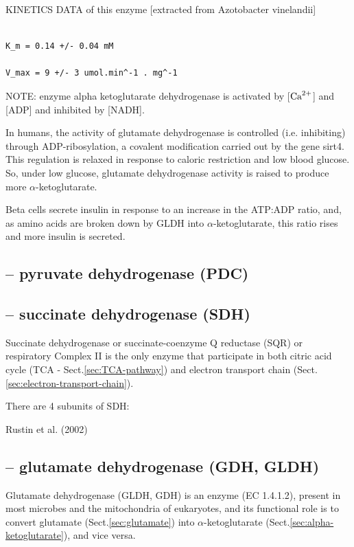 KINETICS DATA of this enzyme [extracted from  Azotobacter vinelandii]
\begin{verbatim}

K_m = 0.14 +/- 0.04 mM 

V_max = 9 +/- 3 umol.min^-1 . mg^-1
\end{verbatim}
NOTE: enzyme alpha ketoglutarate dehydrogenase is activated by [${\text{Ca}^{2+}}$] and
[ADP] and inhibited by [NADH].


In humans, the activity of glutamate dehydrogenase is controlled (i.e.
inhibiting) through ADP-ribosylation, a covalent modification carried out by the
gene sirt4. This regulation is relaxed in response to caloric restriction and
low blood glucose. So, under low glucose, glutamate dehydrogenase activity is
raised to produce more $\alpha$-ketoglutarate.

Beta cells secrete insulin in response to an increase in the ATP:ADP ratio, and,
as amino acids are broken down by GLDH into $\alpha$-ketoglutarate, this ratio rises
and more insulin is secreted.

\subsection{-- pyruvate dehydrogenase (PDC)}
\label{sec:pyruvate-dehydrogenase}
\label{sec:PDC-pyruvate}



\subsection{-- succinate dehydrogenase (SDH)}
\label{sec:succinate-dehydrogenase}

Succinate dehydrogenase or succinate-coenzyme Q reductase (SQR) or respiratory
Complex II is the only enzyme that participate in both citric acid cycle (TCA -
Sect.\ref{sec:TCA-pathway}) and electron transport chain
(Sect.\ref{sec:electron-transport-chain}).

There are 4 subunits of SDH:

Rustin et al. (2002)


\subsection{-- glutamate dehydrogenase (GDH, GLDH)}
\label{sec:glutamate-dehydrogenase}

Glutamate dehydrogenase (GLDH, GDH) is an enzyme (EC 1.4.1.2), present in most microbes and
the mitochondria of eukaryotes, and its functional role is to convert glutamate
(Sect.\ref{sec:glutamate}) into $\alpha$-ketoglutarate
(Sect.\ref{sec:alpha-ketoglutarate}), and vice versa.

